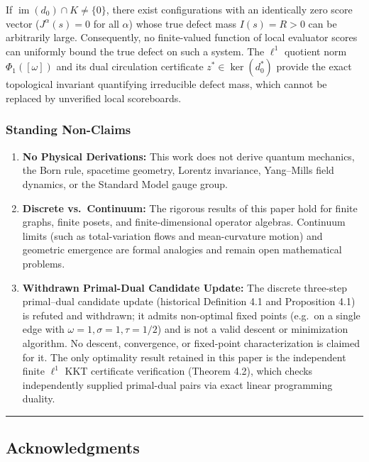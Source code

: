 \documentclass[
]{article}
\providecommand{\tightlist}{%
  \setlength{\itemsep}{0pt}\setlength{\parskip}{0pt}}
\providecommand{\tightlist}{%
  \setlength{\itemsep}{0pt}\setlength{\parskip}{0pt}}
\begin{document}
If \(\operatorname{im}(d_0) \cap K \ne \{0\}\), there exist configurations with an identically zero score vector (\(J^\alpha(s) = 0\) for all \(\alpha\)) whose true defect mass \(I(s) = R > 0\) can be arbitrarily large. Consequently, no finite-valued function of local evaluator scores can uniformly bound the true defect on such a system. The \(\ell^1\) quotient norm \(\Phi_1([\omega])\) and its dual circulation certificate \(z^* \in \ker(d_0^*)\) provide the exact topological invariant quantifying irreducible defect mass, which cannot be replaced by unverified local scoreboards.

\subsubsection{Standing Non-Claims}\label{standing-non-claims}

\begin{enumerate}
\def\labelenumi{\arabic{enumi}.}
\tightlist
\item
  \textbf{No Physical Derivations:} This work does not derive quantum mechanics, the Born rule, spacetime geometry, Lorentz invariance, Yang--Mills field dynamics, or the Standard Model gauge group.
\item
  \textbf{Discrete vs.~Continuum:} The rigorous results of this paper hold for finite graphs, finite posets, and finite-dimensional operator algebras. Continuum limits (such as total-variation flows and mean-curvature motion) and geometric emergence are formal analogies and remain open mathematical problems.
\item
  \textbf{Withdrawn Primal-Dual Candidate Update:} The discrete three-step primal--dual candidate update (historical Definition 4.1 and Proposition 4.1) is refuted and withdrawn; it admits non-optimal fixed points (e.g.~on a single edge with \(\omega=1, \sigma=1, \tau=1/2\)) and is not a valid descent or minimization algorithm. No descent, convergence, or fixed-point characterization is claimed for it. The only optimality result retained in this paper is the independent finite \(\ell^1\) KKT certificate verification (Theorem 4.2), which checks independently supplied primal-dual pairs via exact linear programming duality.
\end{enumerate}

\begin{center}\rule{0.5\linewidth}{0.5pt}\end{center}

\subsection{Acknowledgments}\label{acknowledgments}
\end{document}
